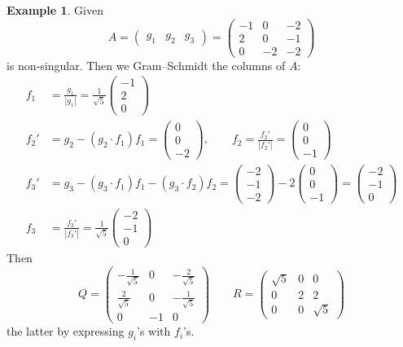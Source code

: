 \documentclass[a4paper]{article}
\theoremstyle{definition}
\newtheorem{example}[defn]{Example}
\begin{document}
\begin{example}
Given
\[
A=\begin{pmatrix}
g_1 & g_2 & g_3
\end{pmatrix} = \begin{pmatrix}
-1 & 0 & -2\\ 2 & 0 & -1\\ 0 & -2 & -2
\end{pmatrix}
\]
is non-singular. Then we Gram--Schmidt the columns of $A$:
\[
\begin{aligned}
f_1&=\frac{g_1}{|g_1|} = \frac{1}{\sqrt 5} \begin{pmatrix}
-1 \\ 2 \\ 0
\end{pmatrix} \\
f_2'&= g_2-(g_2\cdot f_1)f_1=\begin{pmatrix}
0 \\ 0 \\ -2
\end{pmatrix},\qquad f_2=\frac{f_2'}{|f_2'|}=\begin{pmatrix}
0 \\ 0 \\ -1
\end{pmatrix} \\
f_3'&=g_3-(g_3\cdot f_1)f_1-(g_3\cdot f_2)f_2= \begin{pmatrix}
-2 \\ -1 \\ -2
\end{pmatrix}-2\begin{pmatrix}
0 \\ 0 \\ -1
\end{pmatrix} = \begin{pmatrix}
-2 \\ -1 \\ 0
\end{pmatrix} \\
f_3&=\frac{f_3'}{|f_3'|} = \frac{1}{\sqrt 5}\begin{pmatrix}
-2 \\ -1 \\ 0
\end{pmatrix}
\end{aligned}
\]
Then
\[
Q=\begin{pmatrix}
-\frac{1}{\sqrt 5} & 0 & -\frac{2}{\sqrt 5} \\ \frac{2}{\sqrt 5} & 0 & -\frac{1}{\sqrt 5} \\ 0 & -1 & 0
\end{pmatrix} \qquad R=\begin{pmatrix}
\sqrt 5 & 0 & 0 \\ 0 & 2 & 2 \\ 0 & 0 & \sqrt 5
\end{pmatrix}
\]
the latter by expressing $g_i$'s with $f_i$'s.
\end{example}
\end{document}
